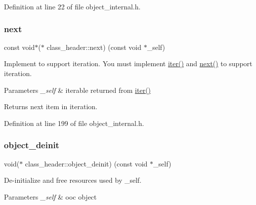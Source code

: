 Definition at line 22 of file object\+\_\+internal.\+h.

\mbox{\label{structclass__header_a34b23ea4b047e4526bfb743d5be3e69c}} 
\subsubsection{\texorpdfstring{next}{next}}
{\footnotesize\ttfamily const void$\ast$($\ast$ class\+\_\+header\+::next) (const void $\ast$\+\_\+self)}

Implement to support iteration. You must implement \mbox{\hyperlink{structclass__header_ab45bdc16b08b8cde751d161dd0c4f230}{iter()}} and \mbox{\hyperlink{structclass__header_a34b23ea4b047e4526bfb743d5be3e69c}{next()}} to support iteration.


\begin{DoxyParams}{Parameters}
{\em \+\_\+self} & iterable returned from \mbox{\hyperlink{structclass__header_ab45bdc16b08b8cde751d161dd0c4f230}{iter()}} \\
\hline
\end{DoxyParams}
\begin{DoxyReturn}{Returns}
next item in iteration. 
\end{DoxyReturn}


Definition at line 199 of file object\+\_\+internal.\+h.

\mbox{\label{structclass__header_aa07a11a17f5d79a66c9086b8d10969b7}} 
\subsubsection{\texorpdfstring{object\+\_\+deinit}{object\_deinit}}
{\footnotesize\ttfamily void($\ast$ class\+\_\+header\+::object\+\_\+deinit) (const void $\ast$\+\_\+self)}

De-\/initialize and free resources used by \+\_\+self.


\begin{DoxyParams}{Parameters}
{\em \+\_\+self} & ooc object \\
\hline
\end{DoxyParams}


